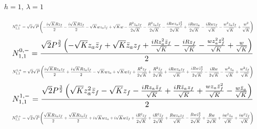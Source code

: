 \documentclass[10pt]{article}
\begin{document}
\paragraph{$h=1,\ \lambda=1$}
\begin{equation*}
\resizebox{0.98\textwidth}{!}{${\displaystyle N^{0,+}_{1,1}=\sqrt{2} \sqrt{P} \left(- \frac{i \sqrt{K} R z_f}{2} - \frac{i \sqrt{K} R \bar z_f}{2} - \sqrt{K} w z_a \bar z_f + \sqrt{K} w - \frac{R^{2} z_a z_f}{2 \sqrt{K}} - \frac{R^{2} z_a \bar z_f}{2 \sqrt{K}} - \frac{i R w z_a \bar z_f^{2}}{2 \sqrt{K}} + \frac{i R w z_a}{2 \sqrt{K}} - \frac{i R w z_f}{\sqrt{K}} - \frac{w^{2} z_a \bar z_f}{\sqrt{K}} + \frac{w^{2}}{\sqrt{K}}\right)}$}
\end{equation*}
\begin{equation*}
\resizebox{0.98\textwidth}{!}{${\displaystyle N^{0,-}_{1,1}=\frac{\sqrt{2} P^{\frac{3}{2}} \left(- \sqrt{K} z_a \bar z_f + \sqrt{K} \bar z_a z_f + \frac{i R z_a^{2} \bar z_f}{\sqrt{K}} - \frac{i R z_f}{\sqrt{K}} - \frac{w z_a^{2} \bar z_f^{2}}{\sqrt{K}} + \frac{w}{\sqrt{K}}\right)}{2}}$}
\end{equation*}
\begin{equation*}
\resizebox{0.98\textwidth}{!}{${\displaystyle N^{1,+}_{1,1}=\sqrt{2} \sqrt{P} \left(\frac{i \sqrt{K} R z_a z_f}{2} + \frac{i \sqrt{K} R z_a \bar z_f}{2} - \sqrt{K} w z_a + \sqrt{K} w \bar z_f + \frac{R^{2} z_f}{2 \sqrt{K}} + \frac{R^{2} \bar z_f}{2 \sqrt{K}} + \frac{i R w z_a z_f}{\sqrt{K}} + \frac{i R w \bar z_f^{2}}{2 \sqrt{K}} - \frac{i R w}{2 \sqrt{K}} - \frac{w^{2} z_a}{\sqrt{K}} + \frac{w^{2} \bar z_f}{\sqrt{K}}\right)}$}
\end{equation*}
\begin{equation*}
\resizebox{0.98\textwidth}{!}{${\displaystyle N^{1,-}_{1,1}=\frac{\sqrt{2} P^{\frac{3}{2}} \left(\sqrt{K} z_a^{2} \bar z_f - \sqrt{K} z_f - \frac{i R z_a \bar z_f}{\sqrt{K}} + \frac{i R \bar z_a z_f}{\sqrt{K}} + \frac{w z_a \bar z_f^{2}}{\sqrt{K}} - \frac{w \bar z_a}{\sqrt{K}}\right)}{2}}$}
\end{equation*}
\begin{equation*}
\resizebox{0.98\textwidth}{!}{${\displaystyle N^{2,+}_{1,1}=\sqrt{2} \sqrt{P} \left(\frac{\sqrt{K} R z_a z_f}{2} + \frac{\sqrt{K} R z_a \bar z_f}{2} + i \sqrt{K} w z_a + i \sqrt{K} w \bar z_f + \frac{i R^{2} z_f}{2 \sqrt{K}} + \frac{i R^{2} \bar z_f}{2 \sqrt{K}} + \frac{R w z_a z_f}{\sqrt{K}} - \frac{R w \bar z_f^{2}}{2 \sqrt{K}} + \frac{R w}{2 \sqrt{K}} + \frac{i w^{2} z_a}{\sqrt{K}} + \frac{i w^{2} \bar z_f}{\sqrt{K}}\right)}$}
\end{equation*}
\end{document}
